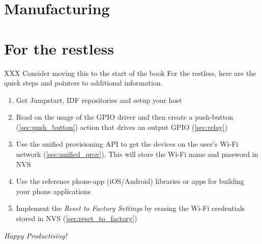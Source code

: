 \documentclass[11pt,fleqn]{book} %
\begin{document}


\chapter{Manufacturing}




\chapter{For the restless}
XXX Consider moving this to the start of the book
For the restless, here are the quick steps and pointers to additional information.
\begin{enumerate}
    \item Get Jumpstart, IDF repositories and setup your host
    \item Read on the usage of the GPIO driver and then create a push-button (\ref{sec:push_button}) action that drives an output GPIO (\ref{sec:relay})
    \item Use the unified provisioning API to get the devices on the user's Wi-Fi network (\ref{sec:unified_prov}). This will store the Wi-Fi name and password in NVS
    \item Use the reference phone-app (iOS/Android) libraries or apps for building your phone applications
    \item Implement the \textit{Reset to Factory Settings} by erasing the Wi-Fi credentials stored in NVS (\ref{sec:reset_to_factory})
\end{enumerate}

\clearpage
\vspace*{\fill} 
\centering \Huge {\textit{Happy Productising!}}
\vspace*{\fill} 
\end{document}
